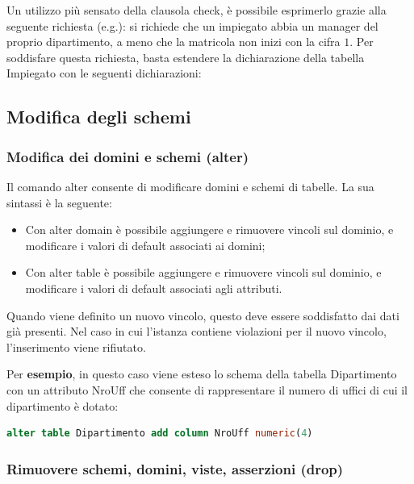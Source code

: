 \documentclass[a4paper]{article}
\begin{document}
	\noindent
	Un utilizzo più sensato della clausola \textsf{check}, è possibile esprimerlo grazie alla seguente richiesta (e.g.): si richiede che un impiegato abbia un manager del proprio dipartimento, a meno che la matricola non inizi con la cifra $1$. Per soddisfare questa richiesta, basta estendere la dichiarazione della tabella Impiegato con le seguenti dichiarazioni:
	\newpage
	
	\subsection{Modifica degli schemi}
	
	\subsubsection{Modifica dei domini e schemi (\textsf{alter})}
	
	Il comando \textsf{alter} consente di modificare domini e schemi di tabelle. La sua sintassi è la seguente:
	
	\begin{itemize}
		\item Con \textsf{alter domain} è possibile aggiungere e rimuovere vincoli sul dominio, e modificare i valori di default associati ai domini;
		\item Con \textsf{alter table} è possibile aggiungere e rimuovere vincoli sul dominio, e modificare i valori di default associati agli attributi.
	\end{itemize}
	Quando viene definito un nuovo vincolo, questo deve essere soddisfatto dai dati già presenti. Nel caso in cui l'istanza contiene violazioni per il nuovo vincolo, l'inserimento viene rifiutato.\newline
	
	\noindent
	Per \textcolor{Green4}{\textbf{esempio}}, in questo caso viene esteso lo schema della tabella Dipartimento con un attributo \textsf{NroUff} che consente di rappresentare il numero di uffici di cui il dipartimento è dotato:
\begin{lstlisting}[language=SQL]
alter table Dipartimento add column NroUff numeric(4)\end{lstlisting}\newpage
	
	\subsubsection{Rimuovere schemi, domini, viste, asserzioni (\textsf{drop})}\label{drop}
	
\end{document}
